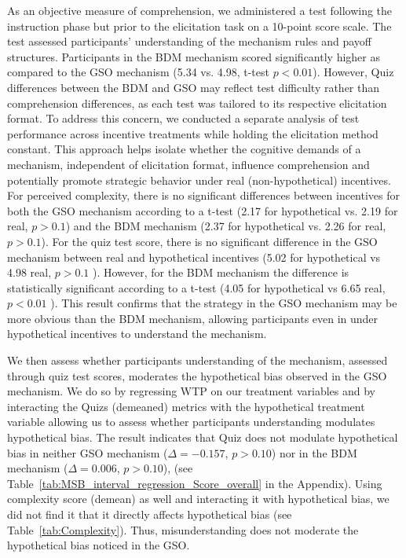 \documentclass[12pt]{article}
\begin{document}
As an objective measure of comprehension, we administered a test following the instruction phase but prior to the elicitation task on a 10-point score scale. The test assessed participants’ understanding of the mechanism rules and payoff structures. Participants in the BDM mechanism scored significantly higher as compared to the GSO mechanism (5.34 vs. 4.98, t-test $p<0.01$).  However, Quiz differences between the BDM and GSO may reflect test difficulty rather than comprehension differences, as each test was tailored to its respective elicitation format.
To address this concern, we conducted a separate analysis of test performance across incentive treatments while holding the elicitation method constant. This approach helps isolate whether the cognitive demands of a mechanism, independent of elicitation format, influence comprehension and potentially promote strategic behavior under real (non-hypothetical) incentives. For perceived complexity, there is no significant differences between incentives for both the GSO mechanism according to a t-test (2.17 for hypothetical vs. 2.19 for real, \(p > 0.1\)) and the BDM mechanism (2.37 for hypothetical vs. 2.26 for real, \(p > 0.1\)). For the quiz test score, there is no significant difference in the GSO mechanism  between real and hypothetical incentives (5.02 for hypothetical vs 4.98 real, \(p > 0.1\) ). However,  for the BDM mechanism the difference is statistically significant according to a t-test (4.05 for hypothetical vs 6.65 real, \(p < 0.01\) ). This result confirms that the strategy in the GSO mechanism may be more obvious than the BDM mechanism, allowing participants even in under hypothetical incentives to understand the mechanism. 

We then assess whether participants understanding of the mechanism, assessed through quiz test scores, moderates the hypothetical bias observed in the GSO mechanism. We do so by regressing WTP on our treatment variables and by interacting the Quizs (demeaned) metrics with the hypothetical treatment variable allowing us to assess whether participants understanding modulates hypothetical bias. 
The result indicates that Quiz does not modulate hypothetical bias in neither GSO mechanism (\(\Delta = -0.157\), \(p > 0.10\))  nor in the BDM mechanism (\(\Delta = 0.006\), \(p > 0.10\)), (see Table~\ref{tab:MSB_interval_regression_Score_overall} in the Appendix). Using complexity score (demean) as well and interacting it with hypothetical bias, we did not find it that it directly affects hypothetical bias (see Table~\ref{tab:Complexity}). Thus, misunderstanding does not moderate the hypothetical bias noticed in the GSO. 
\end{document}
